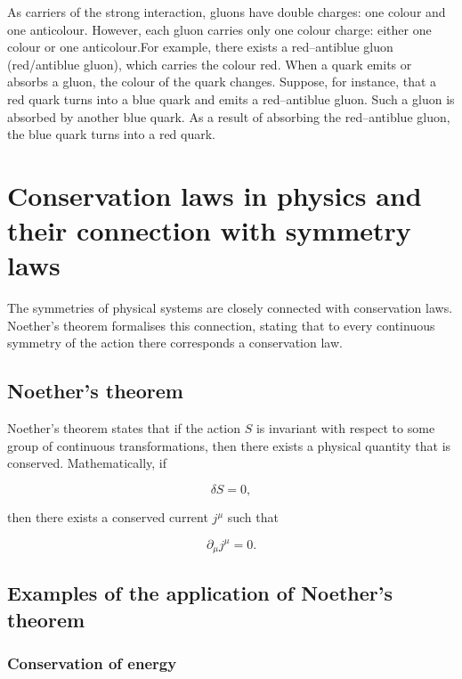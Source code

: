 As carriers of the strong interaction, gluons have double charges: one colour and one anticolour. However, each gluon carries only one colour charge: either one colour or one anticolour.\merr For example, there exists a red--antiblue gluon (red/antiblue gluon), which carries the colour red. When a quark emits or absorbs a gluon, the colour of the quark changes. Suppose, for instance, that a red quark turns into a blue quark and emits a red--antiblue gluon. Such a gluon is absorbed by another blue quark. As a result of absorbing the red--antiblue gluon, the blue quark turns into a red quark.

\section{Conservation laws in physics and their connection with symmetry laws}

The symmetries of physical systems are closely connected with conservation laws. Noether's theorem formalises this connection, stating that to every continuous symmetry of the action there corresponds a conservation law.

\subsection{Noether's theorem}

Noether's theorem states that if the action \( S \) is invariant with respect to some group of continuous transformations, then there exists a physical quantity that is conserved. Mathematically, if

\begin{equation}
\delta S = 0,
\end{equation}

then there exists a conserved current \( j^\mu \) such that

\begin{equation}
\partial_\mu j^\mu = 0.
\end{equation}

\subsection{Examples of the application of Noether's theorem}

\subsubsection{Conservation of energy}


